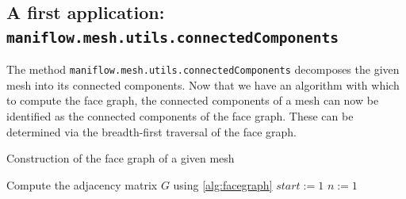 \subsection{A first application: \texttt{maniflow.mesh.utils.connectedComponents}}
The method \texttt{maniflow.mesh.utils.connectedComponents} decomposes the given mesh into its connected components. Now that we have an algorithm with which to compute the face graph, the connected components of a mesh can now be identified as the connected components of the face graph. These can be determined via the breadth-first traversal of the face graph. 
\begin{algorithm}

    \caption{Construction of the face graph of a given mesh}
    \label{alg:components}
    Compute the adjacency matrix $G$ using \ref{alg:facegraph}\;
    $start := 1$\;
    $n := 1$\;
    
\end{algorithm}
